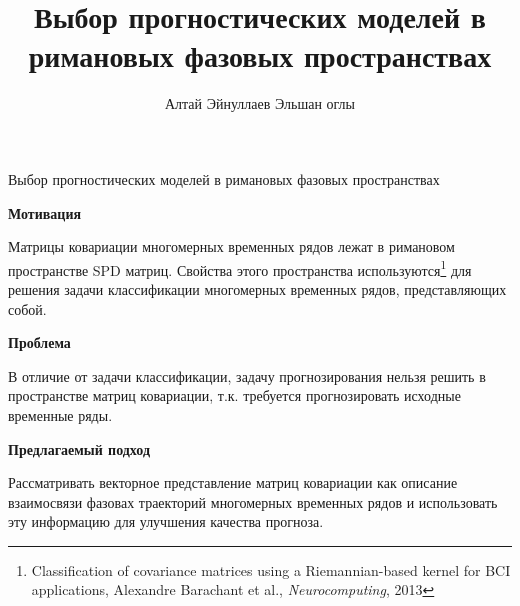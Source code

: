 \documentclass{beamer}
\title[\hbox to 56mm{Попарное расстояние}]{Выбор прогностических моделей в римановых фазовых пространствах}
\author[Эйнуллаев]{Алтай Эйнуллаев Эльшан оглы}
\institute{Московский физико-технический институт}
\date{\footnotesize
\par\smallskip\emph{Научный руководитель:} д.ф-м.н. Стрижов Вадим Викторович
\par\bigskip\small 2024}
\begin{document}
\begin{frame}
\thispagestyle{empty}
\maketitle
\end{frame}
\begin{frame}{Выбор прогностических моделей в римановых фазовых пространствах}

\small
\textbf{Мотивация}

Матрицы ковариации многомерных временных рядов лежат в римановом пространстве SPD матриц. Свойства этого пространства используются\footnote{Classification of covariance matrices using a Riemannian-based kernel for BCI applications, Alexandre Barachant et al., \textit{Neurocomputing}, 2013} для решения задачи классификации многомерных временных рядов, представляющих собой. 

\textbf{Проблема}

В отличие от задачи классификации, задачу прогнозирования нельзя решить в пространстве матриц ковариации, т.к. требуется прогнозировать исходные временные ряды.

\textbf{Предлагаемый подход}

Рассматривать векторное представление матриц ковариации как описание взаимосвязи фазовах траекторий многомерных временных рядов и использовать эту информацию для улучшения качества прогноза.
\end{frame}
\end{document}
